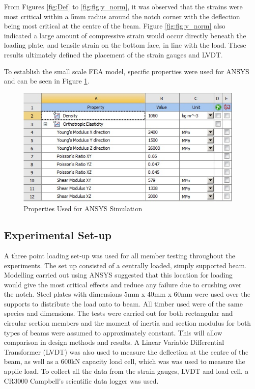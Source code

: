 \documentclass[11pt,a4paper]{article}
\numberwithin{equation}{subsection}
\begin{document}
\noindent
From Figures \ref{fig:Def} to \ref{fig:fig:y_norm}, it was observed that the strains were most critical within a 5mm radius around the notch corner with the deflection being most critical at the centre of the beam. Figure \ref{fig:fig:y_norm} also indicated a large amount of compressive strain would occur directly beneath the loading plate, and tensile strain on the bottom face, in line with the load. These results ultimately defined the placement of the strain gauges and LVDT.

\pagebreak

\noindent
To establish the small scale FEA model, specific properties were used for ANSYS and can be seen in Figure \ref{fig:Properties}.
\vspace*{\baselineskip}
\begin{figure}[h]
	\begin{center}
		\includegraphics[scale=0.65]{Ansys_Properties}
	\end{center}
	\caption{Properties Used for ANSYS Simulation}
	\label{fig:Properties}
\end{figure}

\vspace*{\baselineskip}


\subsection{Experimental Set-up}
A three point loading set-up was used for all member testing throughout the experiments. The set up consisted of a centrally loaded, simply supported beam. Modelling carried out using ANSYS suggested that this location for loading would give the most critical effects and reduce any failure due to crushing over the notch. Steel plates with dimensions 5mm x 40mm x 60mm were used over the supports to distribute the load onto to beam. All timber used were of the same species and dimensions. The tests were carried out for both rectangular and circular section members and the moment of inertia and section modulus for both types of beams were assumed to approximately constant. This will allow comparison in design methods and results. A Linear Variable Differential Transformer (LVDT) was also used to measure the deflection at the centre of the beam, as well as a 600kN capacity load cell, which was was used to measure the applie load. To collect all the data from the strain gauges, LVDT and load cell, a CR3000 Campbell's scientific data logger was used.
\end{document}
